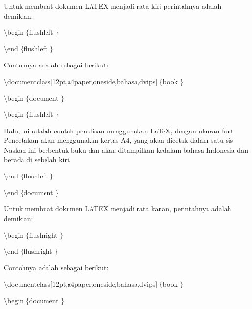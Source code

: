 \begin{itemize}
Untuk membuat dokumen LATEX menjadi rata kiri perintahnya adalah demikian: \par
{\fontsize{10pt}{10pt}\selectfont  $  \setminus  $begin $  \{  $flushleft $  \}  $} \par
{\fontsize{10pt}{10pt}\selectfont [kalimat]} \par
{\fontsize{10pt}{10pt}\selectfont  $  \setminus  $end $  \{  $flushleft $  \}  $} \par
\vspace{12pt}
Contohnya adalah sebagai berikut: \par
{\fontsize{10pt}{10pt}\selectfont  $  \setminus  $documentclass[12pt,a4paper,oneside,bahasa,dvips] $  \{  $book $  \}  $} \par
{\fontsize{10pt}{10pt}\selectfont  $  \setminus  $begin $  \{  $document $  \}  $} \par
{\fontsize{10pt}{10pt}\selectfont  $  \setminus  $begin $  \{  $flushleft $  \}  $} \par
\vspace{9pt}
{\fontsize{10pt}{10pt}\selectfont Halo, ini adalah contoh penulisan menggunakan LaTeX, dengan ukuran font Pencetakan akan menggunakan kertas A4, yang akan dicetak dalam satu sis Naskah ini berbentuk buku dan akan ditampilkan kedalam bahasa Indonesia dan berada di sebelah kiri.} \par
\vspace{9pt}
{\fontsize{10pt}{10pt}\selectfont  $  \setminus  $end $  \{  $flushleft $  \}  $} \par
{\fontsize{10pt}{10pt}\selectfont  $  \setminus  $end $  \{  $document $  \}  $} \par
\vspace{12pt}
Untuk membuat dokumen LATEX menjadi rata kanan, perintahnya adalah demikian: \par
{\fontsize{10pt}{10pt}\selectfont  $  \setminus  $begin $  \{  $flushright $  \}  $} \par
{\fontsize{10pt}{10pt}\selectfont [kalimat]} \par
{\fontsize{10pt}{10pt}\selectfont  $  \setminus  $end $  \{  $flushright $  \}  $} \par
\vspace{12pt}
Contohnya adalah sebagai berikut: \par
{\fontsize{10pt}{10pt}\selectfont  $  \setminus  $documentclass[12pt,a4paper,oneside,bahasa,dvips] $  \{  $book $  \}  $} \par
{\fontsize{10pt}{10pt}\selectfont  $  \setminus  $begin $  \{  $document $  \}  $} \par

\end{itemize}
